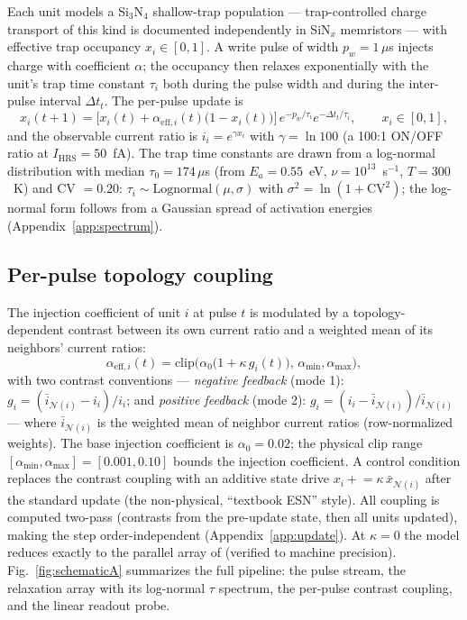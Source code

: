 \documentclass[11pt]{article}
\newcommand{\Dt}{\Delta t}
\begin{document}
Each unit models a Si$_3$N$_4$ shallow-trap population --- trap-controlled
charge transport of this kind is documented independently in SiN$_x$
memristors \cite{gismatulin2019} --- with effective trap
occupancy $x_i \in [0,1]$. A write pulse of width $p_w=1\,\mu$s injects charge
with coefficient $\alpha$; the occupancy then relaxes exponentially with the
unit's trap time constant $\tau_i$ both during the pulse width and during the
inter-pulse interval $\Dt_t$. The per-pulse update is
\begin{equation}
x_i(t+1) = \Big[x_i(t) + \alpha_{\mathrm{eff},i}(t)\big(1-x_i(t)\big)\Big]\,
e^{-p_w/\tau_i} e^{-\Dt_t/\tau_i}, \qquad x_i \in [0,1],
\label{eq:update}
\end{equation}
and the observable current ratio is $i_i = e^{\gamma x_i}$ with
$\gamma=\ln 100$ (a 100:1 ON/OFF ratio at $I_{\mathrm{HRS}}=50$~fA). The trap
time constants are drawn from a log-normal distribution with median
$\tau_0=174\,\mu$s (from $E_a=0.55$~eV, $\nu=10^{13}$~s$^{-1}$, $T=300$~K) and
CV $=0.20$: $\tau_i \sim \mathrm{Lognormal}(\mu,\sigma)$ with
$\sigma^2=\ln(1+\mathrm{CV}^2)$; the log-normal form follows from a Gaussian
spread of activation energies (Appendix~\ref{app:spectrum}).

\subsection{Per-pulse topology coupling}

The injection coefficient of unit $i$ at pulse $t$ is modulated by a
topology-dependent contrast between its own current ratio and a weighted mean
of its neighbors' current ratios:
\begin{equation}
\alpha_{\mathrm{eff},i}(t) = \mathrm{clip}\Big(\alpha_0\big(1 + \kappa\,
g_i(t)\big),\, \alpha_{\min}, \alpha_{\max}\Big),
\label{eq:coupling}
\end{equation}
with two contrast conventions --- \emph{negative feedback} (mode 1):
$g_i=(\bar{i}_{\mathcal{N}(i)} - i_i)/i_i$; and \emph{positive feedback}
(mode 2): $g_i = (i_i - \bar{i}_{\mathcal{N}(i)})/\bar{i}_{\mathcal{N}(i)}$ ---
where $\bar{i}_{\mathcal{N}(i)}$ is the weighted mean of neighbor current
ratios (row-normalized weights). The base injection coefficient is
$\alpha_0=0.02$; the physical clip range
$[\alpha_{\min},\alpha_{\max}]=[0.001,0.10]$ bounds the injection coefficient.
A control condition replaces the contrast coupling with an additive state drive
$x_i \mathrel{+}= \kappa\,\bar{x}_{\mathcal{N}(i)}$ after the standard update
(the non-physical, ``textbook ESN'' style). All coupling is computed two-pass
(contrasts from the pre-update state, then all units updated), making the step
order-independent (Appendix~\ref{app:update}). At $\kappa=0$ the model reduces exactly to
the parallel array of \cite{prior} (verified to machine precision).
Fig.~\ref{fig:schematicA} summarizes the full pipeline: the pulse stream, the
relaxation array with its log-normal $\tau$ spectrum, the per-pulse contrast
coupling, and the linear readout probe.
\end{document}
